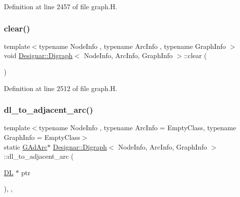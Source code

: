 Definition at line 2457 of file graph.\+H.

\mbox{\label{class_designar_1_1_digraph_a1ec067a8df6129b27e4d79c9c2755899}} 
\subsubsection{\texorpdfstring{clear()}{clear()}}
{\footnotesize\ttfamily template$<$typename Node\+Info , typename Arc\+Info , typename Graph\+Info $>$ \\
void \hyperlink{class_designar_1_1_digraph}{Designar\+::\+Digraph}$<$ Node\+Info, Arc\+Info, Graph\+Info $>$\+::clear (\begin{DoxyParamCaption}{ }\end{DoxyParamCaption})}



Definition at line 2512 of file graph.\+H.

\mbox{\label{class_designar_1_1_digraph_afe3162bf2e56b177e7ee1a938ae2af8b}} 
\subsubsection{\texorpdfstring{dl\+\_\+to\+\_\+adjacent\+\_\+arc()}{dl\_to\_adjacent\_arc()}}
{\footnotesize\ttfamily template$<$typename Node\+Info , typename Arc\+Info  = Empty\+Class, typename Graph\+Info  = Empty\+Class$>$ \\
static \hyperlink{class_designar_1_1_digraph_a0c6d846f23d1e82556fb6055557df53f}{G\+Ad\+Arc}$\ast$ \hyperlink{class_designar_1_1_digraph}{Designar\+::\+Digraph}$<$ Node\+Info, Arc\+Info, Graph\+Info $>$\+::dl\+\_\+to\+\_\+adjacent\+\_\+arc (\begin{DoxyParamCaption}\item[{\hyperlink{class_designar_1_1_d_l}{DL} $\ast$}]{ptr }\end{DoxyParamCaption})\hspace{0.3cm}{\ttfamily [inline]}, {\ttfamily [static]}, {\ttfamily [protected]}}



